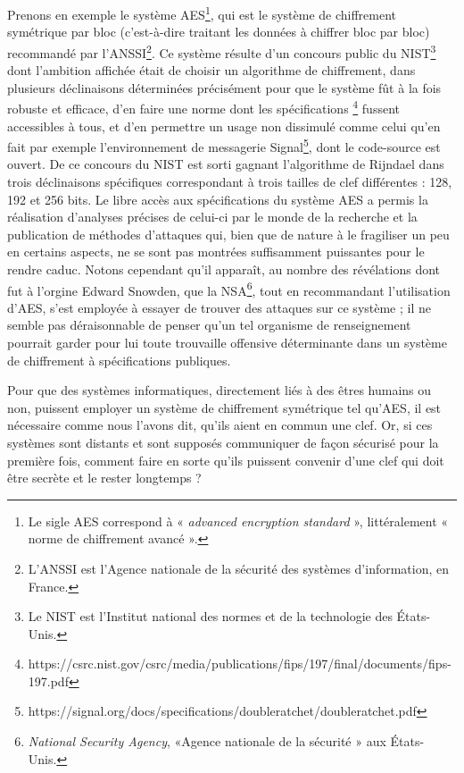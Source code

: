 Prenons en exemple le système AES\footnote{Le sigle AES correspond à « \emph{advanced encryption
standard} », littéralement « norme de chiffrement avancé ».}, qui est le système de chiffrement
symétrique par bloc (c’est-à-dire traitant les données à chiffrer bloc par bloc) recommandé par
l’ANSSI\footnote{L’ANSSI est l’Agence nationale de la sécurité des systèmes d’information, en
France.}.
Ce système résulte d’un concours public du NIST\footnote{Le NIST est l’Institut national des normes
et de la technologie des États-Unis.} dont l’ambition affichée était de choisir un algorithme de
chiffrement, dans plusieurs déclinaisons déterminées précisément pour que le système fût à la fois
robuste et efficace, d’en faire une norme dont les spécifications%
\footnote{https://csrc.nist.gov/csrc/media/publications/fips/197/final/documents/fips-197.pdf}
fussent accessibles à tous, et d’en permettre un usage non dissimulé comme celui qu’en fait par
exemple l’environnement de messagerie
Signal\footnote{https://signal.org/docs/specifications/doubleratchet/doubleratchet.pdf}, dont le
code-source est ouvert.
De ce concours du NIST est sorti gagnant l’algorithme de Rijndael dans trois déclinaisons
spécifiques correspondant à trois tailles de clef différentes : 128, 192 et 256 bits. 
Le libre accès aux spécifications du système AES a permis la réalisation d’analyses précises de
celui-ci par le monde de la recherche et la publication de méthodes d’attaques qui, bien que de
nature à le fragiliser un peu en certains aspects, ne se sont pas montrées suffisamment
puissantes pour le rendre caduc.
Notons cependant qu’il apparaît, au nombre des révélations dont fut à l’orgine Edward Snowden, que
la NSA\footnote{\emph{National Security Agency}, «Agence nationale de la sécurité » aux États-Unis.},
tout en recommandant l’utilisation d’AES, s’est employée à essayer de trouver des attaques sur ce
système ; il ne semble pas déraisonnable de penser qu’un tel organisme de renseignement pourrait
garder pour lui toute trouvaille offensive déterminante dans un système de chiffrement à
spécifications publiques.

Pour que des systèmes informatiques, directement liés à des êtres humains ou non, puissent
employer un système de chiffrement symétrique tel qu’AES, il est nécessaire comme nous l’avons dit,
qu’ils aient en commun une clef.
Or, si ces systèmes sont distants et sont supposés communiquer de façon sécurisé pour la première
fois, comment faire en sorte qu’ils puissent convenir d’une clef qui doit être secrète et le rester
longtemps ?

